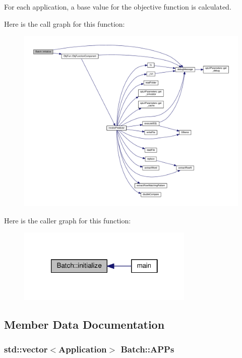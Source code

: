 For each application, a base value for the objective function is calculated. 



Here is the call graph for this function\-:\nopagebreak
\begin{figure}[H]
\begin{center}
\leavevmode
\includegraphics[width=350pt]{classBatch_ae212d22fa812b51160f57507242152c1_cgraph}
\end{center}
\end{figure}




Here is the caller graph for this function\-:\nopagebreak
\begin{figure}[H]
\begin{center}
\leavevmode
\includegraphics[width=238pt]{classBatch_ae212d22fa812b51160f57507242152c1_icgraph}
\end{center}
\end{figure}




\subsection{Member Data Documentation}
\hypertarget{classBatch_a757bf1a36fee46b1b47263ab4a59c560}{
\subsubsection[{A\-P\-Ps}]{\setlength{\rightskip}{0pt plus 5cm}std\-::vector$<${\bf Application}$>$ Batch\-::\-A\-P\-Ps}}\label{classBatch_a757bf1a36fee46b1b47263ab4a59c560}


